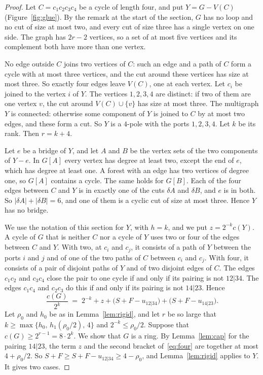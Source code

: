 \begin{proof}
Let $C=c_1c_2c_3c_4$ be a cycle of length four, and put $Y=G-V(C)$ (Figure~\ref{fig:glue}). By
the remark at the start of the section, $G$ has no loop and no cut of size at most two, and
every cut of size three has a single vertex on one side. The graph has $2r-2$ vertices, so a set
of at most five vertices and its complement both have more than one vertex.

 No edge outside $C$ joins two vertices of $C$:
such an edge and a path of $C$ form a cycle with at most three vertices, and the cut around
these vertices has size at most three. So exactly four edges leave $V(C)$, one at each vertex.
Let $c_i$ be joined to the vertex $i$ of $Y$. The vertices $1,2,3,4$ are distinct: if two of
them are one vertex $v$, the cut around $V(C)\cup\{v\}$ has size at most three. The multigraph
$Y$ is connected: otherwise some component of $Y$ is joined to $C$ by at most two edges, and
these form a cut. So $Y$ is a $4$-pole with the ports $1,2,3,4$. Let $k$ be its rank. Then
$r=k+4$.

Let $e$ be a bridge of $Y$, and let $A$ and $B$ be the vertex sets of the two components of
$Y-e$. In $G[A]$ every vertex has degree at least two, except the end of $e$, which has degree at
least one. A forest with an edge has two vertices of degree one, so $G[A]$ contains a cycle. The
same holds for $G[B]$. Each of the four edges between $C$ and $Y$ is in exactly one of the cuts
$\delta A$ and $\delta B$, and $e$ is in both. So $|\delta A|+|\delta B|=6$, and one of them is a
cyclic cut of size at most three. Hence $Y$ has no bridge.

 We use the notation of this section for $Y$, with $h=k$, and we put
$z=2^{-k}c(Y)$. A cycle of $G$ that is neither $C$ nor a cycle of $Y$ uses two or four of the
edges between $C$ and $Y$. With two, at $c_i$ and $c_j$, it consists of a path of $Y$ between the
ports $i$ and $j$ and of one of the two paths of $C$ between $c_i$ and $c_j$. With four, it
consists of a pair of disjoint paths of $Y$ and of two disjoint edges of $C$. The edges $c_1c_2$
and $c_3c_4$ close the pair to one cycle if and only if its pairing is not $12|34$. The edges
$c_1c_4$ and $c_2c_3$ do this if and only if its pairing is not $14|23$. Hence
\begin{equation}\label{eq:four}
  \frac{c(G)}{2^{k}}\;=\;2^{-k}+z+\bigl(S+F-u_{12|34}\bigr)+\bigl(S+F-u_{14|23}\bigr).
\end{equation}
Let $\rho_0$ and $h_0$ be as in Lemma~\ref{lem:rigid}, and let $r$ be so large that
$k\ge\max\{h_0,\,h_1(\rho_0/2),\,4\}$ and $2^{-k}\le\rho_0/2$. Suppose that
$c(G)\ge2^{r-1}=8\cdot2^{k}$. We show that $G$ is a ring. By Lemma~\ref{lem:cap} for the pairing
$14|23$, the term $z$ and the second bracket of~\eqref{eq:four} are together at most
$4+\rho_0/2$. So $S+F\ge S+F-u_{12|34}\ge4-\rho_0$, and Lemma~\ref{lem:rigid} applies to $Y$. It
gives two cases.


\end{proof}
